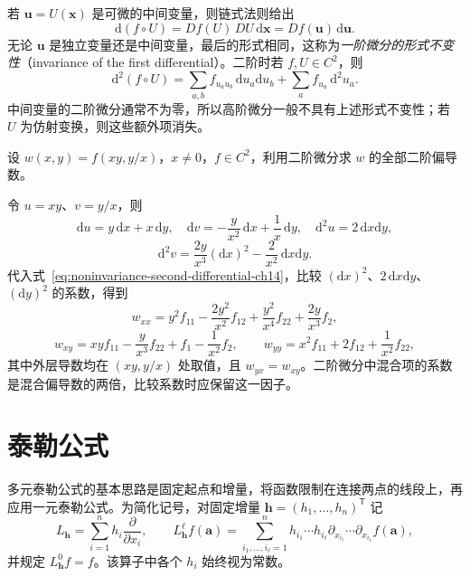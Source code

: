 若 $\boldsymbol u=U(\boldsymbol x)$ 是可微的中间变量，则链式法则给出
\[
    \mathrm d(f\circ U)=Df(U)\,DU\,\mathrm d\boldsymbol x
        =Df(\boldsymbol u)\,\mathrm d\boldsymbol u.
\]
无论 $\boldsymbol u$ 是独立变量还是中间变量，最后的形式相同，这称为\emph{一阶微分的形式不变性}（invariance of the first differential）。二阶时若 $f,U\in C^2$，则
\begin{equation}
\label{eq:noninvariance-second-differential-ch14}
    \mathrm d^2(f\circ U)
    =\sum_{a,b}f_{u_au_b}\,\mathrm du_a\mathrm du_b
       +\sum_a f_{u_a}\,\mathrm d^2u_a.
\end{equation}
中间变量的二阶微分通常不为零，所以高阶微分一般不具有上述形式不变性；若 $U$ 为仿射变换，则这些额外项消失。

\begin{example}
\label{ex:second-partials-by-differentials-ch14}
设 $w(x,y)=f(xy,y/x)$，$x\ne0$，$f\in C^2$，利用二阶微分求 $w$ 的全部二阶偏导数。
\end{example}
\begin{solve}
令 $u=xy$、$v=y/x$，则
\[
    \mathrm du=y\,\mathrm dx+x\,\mathrm dy,\quad
    \mathrm dv=-\frac{y}{x^2}\,\mathrm dx+\frac1x\,\mathrm dy,
    \quad\mathrm d^2u=2\,\mathrm dx\mathrm dy,
\]
\[
    \mathrm d^2v=\frac{2y}{x^3}(\mathrm dx)^2
       -\frac2{x^2}\,\mathrm dx\mathrm dy.
\]
代入式~\eqref{eq:noninvariance-second-differential-ch14}，比较 $(\mathrm dx)^2$、$2\,\mathrm dx\mathrm dy$、$(\mathrm dy)^2$ 的系数，得到
\[
    w_{xx}=y^2f_{11}-\frac{2y^2}{x^2}f_{12}
       +\frac{y^2}{x^4}f_{22}+\frac{2y}{x^3}f_2,
\]
\[
    w_{xy}=xyf_{11}-\frac{y}{x^3}f_{22}+f_1-\frac1{x^2}f_2,
    \qquad
    w_{yy}=x^2f_{11}+2f_{12}+\frac1{x^2}f_{22},
\]
其中外层导数均在 $(xy,y/x)$ 处取值，且 $w_{yx}=w_{xy}$。二阶微分中混合项的系数是混合偏导数的两倍，比较系数时应保留这一因子。
\end{solve}

\section{泰勒公式}
\label{sec:multivariable-taylor-formula}


多元泰勒公式的基本思路是固定起点和增量，将函数限制在连接两点的线段上，再应用一元泰勒公式。为简化记号，对固定增量 $\boldsymbol h=(h_1,\ldots,h_n)^{\mathsf T}$ 记
\[
    L_{\boldsymbol h}=\sum_{i=1}^n h_i\frac{\partial}{\partial x_i},\qquad
    L_{\boldsymbol h}^{\ell}f(\boldsymbol a)
    =\sum_{i_1,\ldots,i_\ell=1}^n
       h_{i_1}\cdots h_{i_\ell}
       \partial_{x_{i_\ell}}\cdots\partial_{x_{i_1}}f(\boldsymbol a),
\]
并规定 $L_{\boldsymbol h}^0f=f$。该算子中各个 $h_i$ 始终视为常数。

